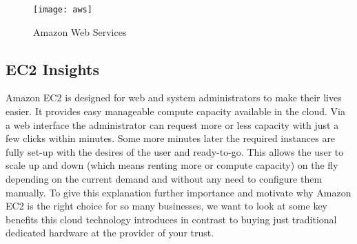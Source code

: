 \begin{figure}
	\centering
		\texttt{[image: aws]}
	\caption{Amazon Web Services}
\end{figure}

\subsection{EC2 Insights}
Amazon EC2 is designed for web and system administrators to make their lives easier. It provides easy manageable compute capacity available in the cloud. Via a web interface the administrator can request more or less capacity with just a few clicks within minutes. Some more minutes later the required instances are fully set-up with the desires of the user and ready-to-go. This allows the user to scale up and down (which means renting more or compute capacity) on the fly depending on the current demand and without any need to configure them manually. To give this explanation further importance and motivate why Amazon EC2 is the right choice for so many businesses, we want to look at some key benefits this cloud technology introduces in contrast to buying just traditional dedicated hardware at the provider of your trust. 

